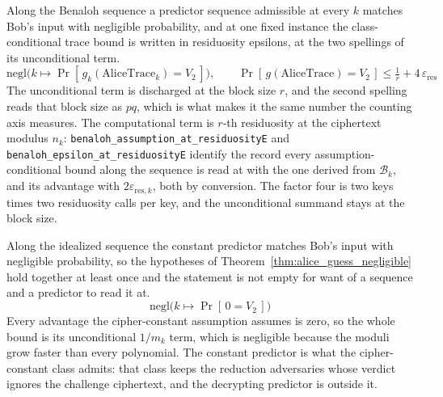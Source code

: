 \begin{corollary}
  \label{cor:benaloh_security}
  \rocqok
  Along the Benaloh sequence a predictor sequence admissible at every $k$
  matches Bob's input with negligible probability, and at one fixed instance
  the class-conditional trace bound is written in residuosity epsilons, at
  the two spellings of its unconditional term.
  \[ \mathrm{negl}\big(k \mapsto
       \Pr[\,g_k(\mathrm{AliceTrace}_k) = V_2\,]\big), \qquad
     \Pr[\,g(\mathrm{AliceTrace}) = V_2\,]
       \le \tfrac{1}{r} + 4\,\varepsilon_{\mathrm{res}} \]
  The unconditional term is discharged at the block size $r$, and the second
  spelling reads that block size as $p q$, which is what makes it the same
  number the counting axis measures. The computational term is $r$-th
  residuosity at the ciphertext modulus $n_k$:
  \texttt{benaloh\_assumption\_at\_residuosityE} and
  \texttt{benaloh\_epsilon\_at\_residuosityE} identify the record every
  assumption-conditional bound along the sequence is read at with the one
  derived from $\mathcal{B}_k$, and its advantage with
  $2\varepsilon_{\mathrm{res},k}$, both by conversion. The factor four is two
  keys times two residuosity calls per key, and the unconditional summand
  stays at the block size.
\end{corollary}

\begin{corollary}
  \label{cor:idealized_security}
  \rocqok
  Along the idealized sequence the constant predictor matches Bob's input with
  negligible probability, so the hypotheses of
  Theorem~\ref{thm:alice_guess_negligible} hold together at least once and the
  statement is not empty for want of a sequence and a predictor to read it at.
  \[ \mathrm{negl}\big(k \mapsto
       \Pr[\,0 = V_2\,]\big) \]
  Every advantage the cipher-constant assumption assumes is zero, so the whole
  bound is its unconditional $1/m_k$ term, which is negligible because the
  moduli grow faster than every polynomial. The constant predictor is what the
  cipher-constant class admits: that class keeps the reduction adversaries
  whose verdict ignores the challenge ciphertext, and the decrypting predictor
  is outside it.
\end{corollary}

